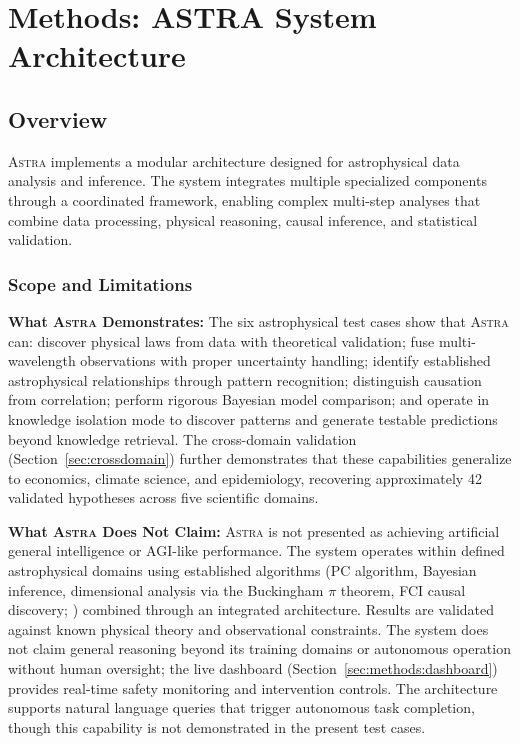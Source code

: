 \documentclass[usenatbib]{rasti}
\newcommand{\astra}{\textsc{Astra}\xspace}
\newcommand{\pc}{PC\xspace}
\newcommand{\fci}{FCI\xspace}
\begin{document}
\section{Methods: ASTRA System Architecture}
\label{sec:methods}

\subsection{Overview}
\label{sec:methods:overview}

\astra implements a modular architecture designed for astrophysical data analysis and inference.
The system integrates multiple specialized components through a coordinated framework, enabling complex multi-step analyses that combine data processing, physical reasoning, causal inference, and statistical validation.

\subsubsection{Scope and Limitations}
\label{sec:scope}

\textbf{What \astra Demonstrates:}
The six astrophysical test cases show that \astra can: discover physical laws from data with theoretical validation; fuse multi-wavelength observations with proper uncertainty handling; identify established astrophysical relationships through pattern recognition; distinguish causation from correlation; perform rigorous Bayesian model comparison; and operate in knowledge isolation mode to discover patterns and generate testable predictions beyond knowledge retrieval.
The cross-domain validation (Section~\ref{sec:crossdomain}) further demonstrates that these capabilities generalize to economics, climate science, and epidemiology, recovering approximately 42 validated hypotheses across five scientific domains.

\textbf{What \astra Does Not Claim:}
\astra is not presented as achieving artificial general intelligence or AGI-like performance.
The system operates within defined astrophysical domains using established algorithms (\pc algorithm, Bayesian inference, dimensional analysis via the Buckingham $\pi$ theorem, \fci causal discovery; \citealt{Zhang2008}) combined through an integrated architecture.
Results are validated against known physical theory and observational constraints.
The system does not claim general reasoning beyond its training domains or autonomous operation without human oversight; the live dashboard (Section~\ref{sec:methods:dashboard}) provides real-time safety monitoring and intervention controls.
The architecture supports natural language queries that trigger autonomous task completion, though this capability is not demonstrated in the present test cases.
\end{document}
